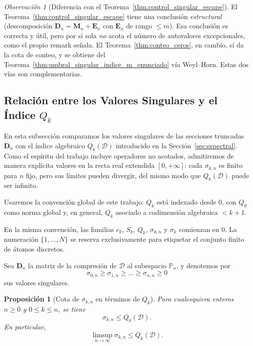 \documentclass[12pt,a4paper]{article}
\newtheorem{proposition}{Proposición}
\theoremstyle{definition}
\theoremstyle{remark}
\newtheorem{remark}{Observación}
\newcommand{\D}{\mathcal{D}}
\begin{document}
\begin{remark}[Diferencia con el Teorema~\ref{thm:control_singular_escape}]\label{rem:weyl_horn_vs_control}
  El Teorema~\ref{thm:control_singular_escape} tiene una conclusión
  \emph{estructural} (descomposición $\mathbf D_n=\mathbf M_n+\mathbf E_n$
  con $\mathbf E_n$ de rango $\le m$). Esa conclusión es correcta y útil,
  pero por sí sola \emph{no} acota el número de autovalores excepcionales,
  como el propio remark señala. El Teorema~\ref{thm:conteo_ceros},
  en cambio, sí da la cota de conteo, y se obtiene del Teorema~\ref{thm:umbral_singular_indice_m_enunciado}
  vía Weyl--Horn. Estas dos vías son complementarias.
\end{remark}

\subsection{Relación entre los Valores Singulares y el Índice $Q_k$}

En esta subsección comparamos los valores singulares de las secciones truncadas $\mathbf{D}_n$ con el índice algebraico $Q_k(\D)$ introducido en la Sección~\ref{sec:espectral}. Como el espíritu del trabajo incluye operadores no acotados, admitiremos de manera explícita valores en la recta real extendida $[0,+\infty]$: cada $\sigma_{k,n}$ es finito para $n$ fijo, pero sus límites pueden divergir, del mismo modo que $Q_k(\D)$ puede ser infinito.

Usaremos la convención global de este trabajo: $Q_k$ está indexado desde $0$, con $Q_0$ como norma global y, en general, $Q_k$ asociado a codimensión algebraica $<k+1$.

En la misma convención, las familias $c_k$, $S_k$, $Q_k$, $\sigma_{k,n}$ y $\sigma_k$ comienzan en $0$. La numeración $\{1,\dots,N\}$ se reserva exclusivamente para etiquetar el conjunto finito de átomos discretos.

Sea $\mathbf{D}_n$ la matriz de la compresión de $\D$ al subespacio $\mathbb{P}_{n}$, y denotemos por
\[
  \sigma_{0,n} \ge \sigma_{1,n} \ge \dots \ge \sigma_{n,n} \ge 0
\]
sus valores singulares.

\begin{proposition}[Cota de $\sigma_{k,n}$ en términos de $Q_k$]\label{prop:sigma_qk}
  Para cualesquiera enteros $n \ge 0$ y $0 \le k \le n$, se tiene
  \[
    \sigma_{k,n} \le Q_k(\D).
  \]
  En particular,
  \[
    \limsup_{n \to \infty} \sigma_{k,n} \le Q_k(\D).
  \]
\end{proposition}
\end{document}
